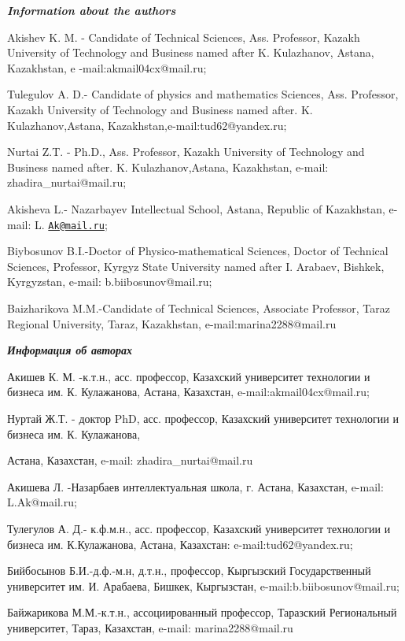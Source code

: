 \begin{authorinfo}
\emph{{\bfseries Information about the authors}}

Akishev K. M. - Candidate of Technical Sciences, Ass. Professor, Kazakh
University of Technology and Business named after K. Kulazhanov, Astana,
Kazakhstan, e -mail:akmail04cx@mail.ru;

Tulegulov A. D.- Candidate of physics and mathematics Sciences, Ass.
Professor, Kazakh University of Technology and Business named after. K.
Kulazhanov,Astana, Kazakhstan,e-mail:tud62@yandex.ru;

Nurtai Z.T. - Ph.D., Ass. Professor, Kazakh University of Technology and
Business named after. K. Kulazhanov,Astana, Kazakhstan, e-mail:
zhadira\_nurtai@mail.ru;

Akisheva L.- Nazarbayev Intellectual School, Astana, Republic of
Kazakhstan, e-mail: L. \href{mailto:Ak@mail.ru}{\nolinkurl{Ak@mail.ru}};

Biybosunov B.I.-Doctor of Physico-mathematical Sciences, Doctor of
Technical Sciences, Professor, Kyrgyz State University named after I.
Arabaev, Bishkek, Kyrgyzstan, e-mail: b.biibosunov@mail.ru;

Baizharikova M.M.-Candidate of Technical Sciences, Associate Professor,
Taraz Regional University, Taraz, Kazakhstan, e-mail:marina2288@mail.ru

\emph{{\bfseries Информация об авторах}}

Акишев К. М. -к.т.н., асс. профессор, Казахский университет технологии и
бизнеса им. К. Кулажанова, Астана, Казахстан, e-mail:akmail04cx@mail.ru;

Нуртай Ж.Т. - доктор PhD, асс. профессор, Казахский университет
технологии и бизнеса им. К. Кулажанова,

Астана, Казахстан, e-mail: zhadira\_nurtai@mail.ru

Акишева Л. -Назарбаев интеллектуальная школа, г. Астана, Казахстан,
e-mail: L.Ak@mail.ru;

Тулегулов А. Д.- к.ф.м.н., асс. профессор, Казахский университет
технологии и бизнеса им. К.Кулажанова, Астана, Казахстан:
e-mail:tud62@yandex.ru;

Бийбосынов Б.И.-д.ф.-м.н, д.т.н., профессор, Кыргызский Государственный
университет им. И. Арабаева, Бишкек, Кыргызстан,
e-mail:b.biibosunov@mail.ru;

Байжарикова М.М.-к.т.н., ассоциированный профессор, Таразский
Региональный университет, Тараз, Казахстан, e-mail: marina2288@mail.ru
\end{authorinfo}
